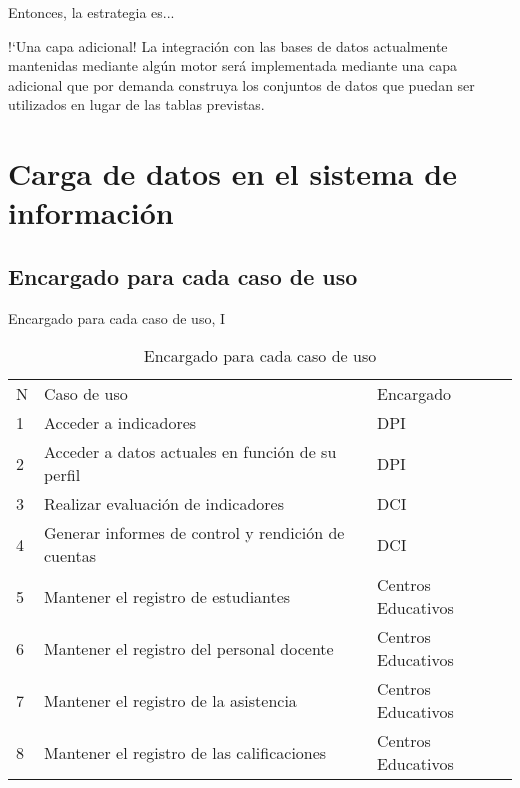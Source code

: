 \documentclass[xcolor=table, aspectratio=169]{beamer}
\begin{document}
\begin{frame}[t]{Entonces, la estrategia es...}
    \begin{block}{!`Una capa adicional!}
		La integraci\'on con las bases de datos actualmente mantenidas mediante alg\'un motor ser\'a implementada mediante una capa adicional que por demanda construya los conjuntos de datos que puedan ser utilizados en lugar de las tablas previstas.
	\end{block}
\end{frame}

\section{Carga de datos en el sistema de informaci\'on}

\subsection{Encargado para cada caso de uso}

\begin{frame}[t]{Encargado para cada caso de uso, I}
	\begin{table}[H]
		\centering
		\caption{Encargado para cada caso de uso}
		\label{facts}
		\begin{tabular}{lll}
			\rowcolor[HTML]{333333}
			{\color[HTML]{FFFFFF} N} & {\color[HTML]{FFFFFF} Caso de uso} & {\color[HTML]{FFFFFF} Encargado} \\
    		1 & Acceder a indicadores & DPI \\
    		2 & Acceder a datos actuales en funci\'on de su perfil & DPI \\
    		3 & Realizar evaluaci\'on de indicadores & DCI \\
    		4 & Generar informes de control y rendici\'on de cuentas & DCI \\
    		5 & Mantener el registro de estudiantes & Centros Educativos \\
    		6 & Mantener el registro del personal docente & Centros Educativos \\
    		7 & Mantener el registro de la asistencia & Centros Educativos \\
    		8 & Mantener el registro de las calificaciones & Centros Educativos
		\end{tabular}
	\end{table}
\end{frame}
\end{document}
